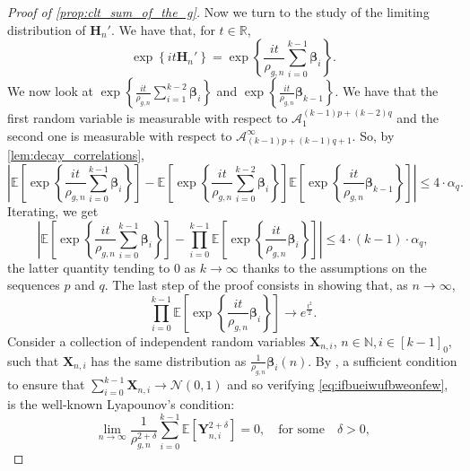 \documentclass[11pt,a4paper,oneside]{article}
\theoremstyle{definition}
\theoremstyle{remark}
\def\E{\mathbb{E}}
\begin{document}
\begin{proof}[Proof of \cref{prop:clt_sum_of_the_g}]
	Now we turn to the study of the limiting distribution of $\bm H_n'$. 
	We have that, for $t \in \mathbb{R}$,
	\begin{equation}
	\exp \left\{ it \bm H_n' \right\}  =	\exp \left\{ \frac{it}{\rho_{g,n}} \sum_{i=0}^{k-1} \bm \beta_i  \right\}.
	\end{equation}
	We now look at 
	$\exp \left\{ \frac{it}{\rho_{g,n}} \sum_{i=1}^{k-2} \bm \beta_i  \right\}$ 
	and 
	$ 	\exp \left\{ \frac{it}{\rho_{g,n}}  \bm \beta_{k-1} \right\}$.
	We have that the first random variable is measurable with respect to $\mathcal A_1^{(k-1)p + (k-2)q}$ and the second one is measurable with respect to $\mathcal A_{(k-1)p + (k-1)q+1}^{\infty}$. So, by \cref{lem:decay_correlations}, 
	\begin{equation}
		\left| \E \left[\exp \left\{ \frac{it}{\rho_{g,n}}\sum_{i=0}^{k-1} \bm \beta_i \right\} \right] - \E \left[	\exp \left\{ \frac{it}{\rho_{g,n}}\sum_{i=0}^{k-2} \bm \beta_i \right\}\right] \E \left[ \exp \left\{ \frac{it}{\rho_{g,n}}  \bm \beta_{k-1} \right\}\right]\right| \leq 4 \cdot \alpha_q.
	\end{equation}
	Iterating, we get
		\begin{equation}\label{eq:char_function_ofh_converges}
	\left| \E \left[\exp \left\{ \frac{it}{\rho_{g,n}}\sum_{i=0}^{k-1} \bm \beta_i \right\} \right] - 
	\prod_{i=0}^{k-1} \E \left[ \exp \left\{ \frac{it}{\rho_{g,n}}  \bm \beta_{i} \right\}\right]\right|  \leq 4 \cdot (k-1) \cdot \alpha_q, 
	\end{equation}
	the latter quantity tending to $0$ as $k \to \infty$ thanks to the assumptions on the sequences $p$ and $q$.		
	The last step of the proof consists in showing that, as $n \to \infty$,
	\begin{equation}\label{eq:ifbueiwufbweonfew}
	\prod_{i=0}^{k-1} \E \left[ \exp \left\{ \frac{it}{\rho_{g,n}}  \bm \beta_{i} \right\}\right] \to e^{ \frac{t^2}{2} }.
	\end{equation}
	Consider a collection of independent random variables $\bm X_{n,i}$, $n \in \mathbb{N}, i \in [k-1]_0$, such that $\bm X_{n,i}$ has the same distribution as $\frac{1}{\rho_{g,n}}\bm \beta_i (n)$.   
	By  \cite[Theorem 27.3]{MR1324786}, a sufficient condition to ensure that $\sum_{i=0}^{k-1}\bm X_{n,i}\to \bm{\mathcal N}(0,1)$ and so verifying \cref{eq:ifbueiwufbweonfew},
	is the well-known Lyapounov's condition:
	\begin{equation}\label{eq:fbbfoqehfoiewqhf}
		 \lim_{n \to \infty} \frac{1	}{\rho_{g,n}^{2+\delta}} \sum_{i=0}^{k-1} \E \left[ \bm Y_{n,i}^{2+\delta}    \right] = 0, \quad \text{for some} \quad \delta>0,

\end{equation}
\end{proof}
\end{document}
